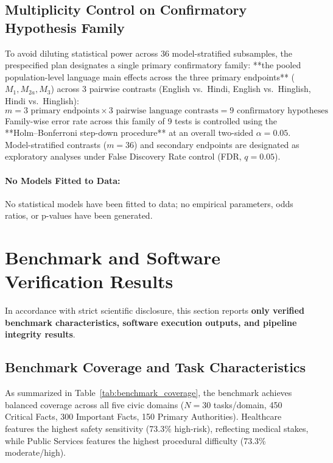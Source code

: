\documentclass[11pt,a4paper]{article}
\begin{document}
\subsection{Multiplicity Control on Confirmatory Hypothesis Family}
\label{sec:multiplicity}

To avoid diluting statistical power across 36 model-stratified subsamples, the prespecified plan designates a single primary confirmatory family: **the pooled population-level language main effects across the three primary endpoints** ($M_1, M_{2a}, M_3$) across 3 pairwise contrasts (English vs.\ Hindi, English vs.\ Hinglish, Hindi vs.\ Hinglish):
\begin{equation}
\label{eq:hypotheses}
m = 3 \text{ primary endpoints} \times 3 \text{ pairwise language contrasts} = 9 \text{ confirmatory hypotheses}
\end{equation}
Family-wise error rate across this family of 9 tests is controlled using the **Holm--Bonferroni step-down procedure** at an overall two-sided $\alpha = 0.05$. Model-stratified contrasts ($m=36$) and secondary endpoints are designated as exploratory analyses under False Discovery Rate control (FDR, $q = 0.05$).

\paragraph{No Models Fitted to Data:} No statistical models have been fitted to data; no empirical parameters, odds ratios, or p-values have been generated.

\section{Benchmark and Software Verification Results}
\label{sec:results}

In accordance with strict scientific disclosure, this section reports \textbf{only verified benchmark characteristics, software execution outputs, and pipeline integrity results}.

\subsection{Benchmark Coverage and Task Characteristics}
\label{sec:benchmark_characteristics}

As summarized in Table~\ref{tab:benchmark_coverage}, the benchmark achieves balanced coverage across all five civic domains ($N=30$ tasks/domain, 450 Critical Facts, 300 Important Facts, 150 Primary Authorities). Healthcare features the highest safety sensitivity (73.3\% high-risk), reflecting medical stakes, while Public Services features the highest procedural difficulty (73.3\% moderate/high).
\end{document}
